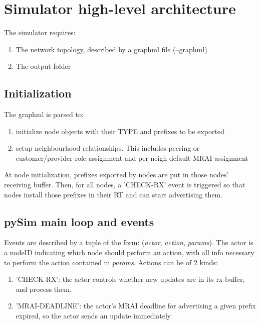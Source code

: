 \documentclass[fleqn,10pt]{SelfArx} %
\begin{document}
\flushbottom %
\maketitle %
\thispagestyle{empty} %

\section{Simulator high-level architecture} 
The simulator requires:
\begin{enumerate}[noitemsep]
  \item The network topology, described by a graphml file (\textsf{--graphml})
  \item The output folder
\end{enumerate}

\subsection*{Initialization}
The graphml is parsed to:
\begin{enumerate}[noitemsep]
  \item initialize node objects with their TYPE and prefixes to be exported
  \item setup neighbourhood relationships. This includes peering or customer/provider role assignment and per-neigh default-MRAI assignment
\end{enumerate}
At node initialization, prefixes exported by nodes are put in those nodes' receiving buffer. Then, for all nodes, a 'CHECK-RX' event is triggered so that nodes install those prefixes in their RT and can start advertising them. 

\subsection*{pySim main loop and events}
Events are described by a tuple of the form: (\textit{actor}, \textit{action}, \textit{params}). The actor is a nodeID indicating which node should perform an action, with all info necessary to perform the action contained in \textit{params}. Actions can be of 2 kinds:

\begin{enumerate}[noitemsep]
 \item 'CHECK-RX': the actor controls whether new updates are in its rx-buffer, and process them.
 \item 'MRAI-DEADLINE': the actor's MRAI deadline for advertising a given prefix expired, so the actor sends an update immediately
\end{enumerate}
\end{document}
